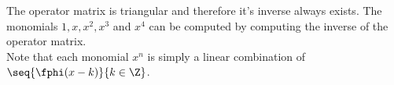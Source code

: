 \begin{example}
\begin{footnotesize}
The operator matrix is triangular and therefore it's inverse
always exists.
The monomials $1, x, x^2, x^3$ and $x^4$ can be computed by
computing the inverse of the operator matrix.
\\
Note that each monomial $x^n$ is simply a linear combination
of $\seq{\fphi(x-k)}{k\in\Z}$.

\end{footnotesize}
\end{example}
